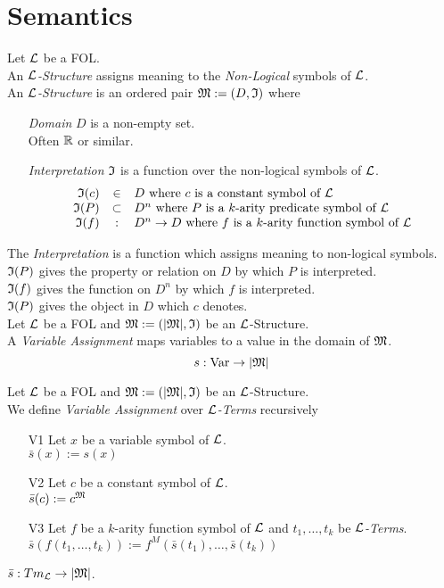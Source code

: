 \documentclass[11pt,a4paper]{article}
\begin{document}

\section{Semantics}

Let $\mathcal{L}$ be a FOL.\\
An \textit{$\mathcal{L}$-Structure} assigns meaning to the \textit{Non-Logical} symbols of $\mathcal{L}$.\\
An \textit{$\mathcal{L}$-Structure} is an ordered pair $\mathfrak{M}:=(D,\mathfrak{I})$ where
\begin{itemize}
	\item[\textit{Domain}] $D$ is a non-empty set.\\
	Often $\mathbb{R}$ or similar.
	\item[\textit{Interpretation}] $\mathfrak{I}$ is a function over the non-logical symbols of $\mathcal{L}$.
	\[\begin{array}{rcl}
	\mathfrak{I}(c)&\in&D\text{ where }c\text{ is a constant symbol of }\mathcal{L}\\
	\mathfrak{I}(P)&\subset&D^n\text{ where }P\text{ is a }k\text{-arity predicate symbol of }\mathcal{L}\\
	\mathfrak{I}(f)&:&D^n\to D\text{ where }f\text{ is a }k\text{-arity function symbol of }\mathcal{L}
	\end{array}\]
\end{itemize}

The \textit{Interpretation} is a function which assigns meaning to non-logical symbols.\\
$\mathfrak{I}(P)$ gives the property or relation on $D$ by which $P$ is interpreted.\\
$\mathfrak{I}(f)$ gives the function on $D^n$ by which $f$ is interpreted.\\
$\mathfrak{I}(P)$ gives the object in $D$ which $c$ denotes.\\

Let $\mathcal{L}$ be a FOL and $\mathfrak{M}:=(|\mathfrak{M}|,\mathfrak{I})$ be an $\mathcal{L}$-Structure.\\
A \textit{Variable Assignment} maps variables to a value in the domain of $\mathfrak{M}$.
$$s:\mathrm{Var}\to|\mathfrak{M}|$$

Let $\mathcal{L}$ be a FOL and $\mathfrak{M}:=(|\mathfrak{M}|,\mathfrak{I})$ be an $\mathcal{L}$-Structure.\\
We define \textit{Variable Assignment} over \textit{$\mathcal{L}$-Terms} recursively
\begin{itemize}
	\item[V1] Let $x$ be a variable symbol of $\mathcal{L}$.\\
	$\bar{s}(x):=s(x)$
	\item[V2] Let $c$ be a constant symbol of $\mathcal{L}$.\\
	$\bar{s}(c):=c^{\mathfrak{M}}$
	\item[V3] Let $f$ be a $k$-arity function symbol of $\mathcal{L}$ and $t_1,\dots,t_k$ be \textit{$\mathcal{L}$-Terms}.\\
	$\bar{s}(f(t_1,\dots,t_k)):=f^M(\bar{s}(t_1),\dots,\bar{s}(t_k))$
\end{itemize}
\nb $\bar{s}:Tm_{\mathcal{L}}\to|\mathfrak{M}|$.\\
\end{document}
